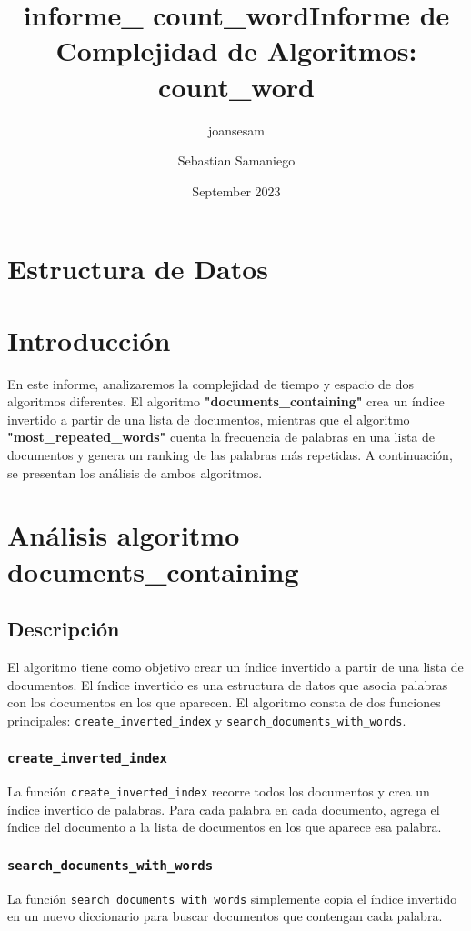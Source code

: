 \documentclass{article}
\title{informe_ count_word}
\author{joansesam }
\date{September 2023}
\title{Informe de Complejidad de Algoritmos: \textbf{count\_word}}
\author{Sebastian Samaniego}
\begin{document}
\maketitle
\section*{Estructura de Datos}
\section{Introducción}
En este informe, analizaremos la complejidad de tiempo y espacio de dos algoritmos diferentes. El algoritmo \textbf{"documents\_containing"} crea un índice invertido a partir de una lista de documentos, mientras que el algoritmo \textbf{"most\_repeated\_words"} cuenta la frecuencia de palabras en una lista de documentos y genera un ranking de las palabras más repetidas. A continuación, se presentan los análisis de ambos algoritmos.

\section{Análisis algoritmo documents\_containing}

\subsection{Descripción}
El algoritmo tiene como objetivo crear un índice invertido a partir de una lista de documentos. El índice invertido es una estructura de datos que asocia palabras con los documentos en los que aparecen. El algoritmo consta de dos funciones principales: \texttt{create\_inverted\_index} y \texttt{search\_documents\_with\_words}.

\subsubsection{\texttt{create\_inverted\_index}}
La función \texttt{create\_inverted\_index} recorre todos los documentos y crea un índice invertido de palabras. Para cada palabra en cada documento, agrega el índice del documento a la lista de documentos en los que aparece esa palabra.

\subsubsection{\texttt{search\_documents\_with\_words}}
La función \texttt{search\_documents\_with\_words} simplemente copia el índice invertido en un nuevo diccionario para buscar documentos que contengan cada palabra.
\end{document}
